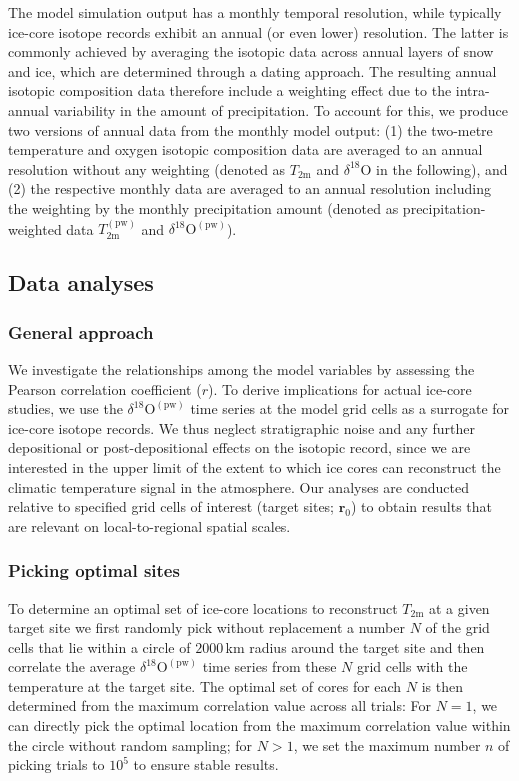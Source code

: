 \documentclass[cp, manuscript]{copernicus}
\begin{document}
The model simulation output has a monthly temporal resolution, while typically
ice-core isotope records exhibit an annual (or even lower) resolution. The
latter is commonly achieved by averaging the isotopic data across annual layers
of snow and ice, which are determined through a dating approach. The resulting
annual isotopic composition data therefore include a weighting effect due to the
intra-annual variability in the amount of precipitation. To account for this, we
produce two versions of annual data from the monthly model output: (1) the
two-metre temperature and oxygen isotopic composition data are averaged to an
annual resolution without any weighting (denoted as $T_{2\mathrm{m}}$ and
$\delta^{18}\mathrm{O}$ in the following), and (2) the respective monthly data
are averaged to an annual resolution including the weighting by the monthly
precipitation amount (denoted as precipitation-weighted data
$T_{2\mathrm{m}}^{\mathrm{(pw)}}$ and $\delta^{18}\mathrm{O}^{\mathrm{(pw)}}$).

\subsection{Data analyses}\label{methods:main}

\subsubsection{General approach}\label{methods:general}

We investigate the relationships among the model variables by assessing the
Pearson correlation coefficient ($r$). To derive implications for actual
ice-core studies, we use the $\delta^{18}\mathrm{O}^{\mathrm{(pw)}}$ time series
at the model grid cells as a surrogate for ice-core isotope records. We thus
neglect stratigraphic noise and any further depositional or post-depositional
effects on the isotopic record, since we are interested in the upper limit of
the extent to which ice cores can reconstruct the climatic temperature signal in
the atmosphere. Our analyses are conducted relative to specified grid cells of
interest (target sites; $\mathbf{r}_0$) to obtain results that are relevant on
local-to-regional spatial scales.

\subsubsection{Picking optimal sites}\label{methods:picking}

To determine an optimal set of ice-core locations to reconstruct
$T_{2\mathrm{m}}$ at a given target site we first randomly pick without
replacement a number $N$ of the grid cells that lie within a circle of
$2000$\,km radius around the target site and then correlate the average
$\delta^{18}\mathrm{O}^{\mathrm{(pw)}}$ time series from these $N$ grid cells
with the temperature at the target site. The optimal set of cores for each $N$
is then determined from the maximum correlation value across all trials: For
$N=1$, we can directly pick the optimal location from the maximum correlation
value within the circle without random sampling; for $N>1$, we set the maximum
number $n$ of picking trials to $10^5$ to ensure stable results.
\end{document}
